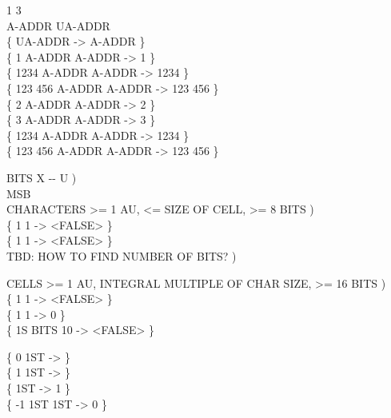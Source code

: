 \begin{tt}
  1      3   \\
 A-ADDR   UA-ADDR \\
\{ UA-ADDR  -> A-ADDR \} \\
\{       1 A-ADDR                 A-ADDR               ->       1 \} \\
\{    1234 A-ADDR \word{!}                 A-ADDR                ->    1234 \} \\
\{ 123 456 A-ADDR                 A-ADDR               -> 123 456 \} \\
\{       2 A-ADDR     A-ADDR   ->       2 \} \\
\{       3 A-ADDR     A-ADDR   ->       3 \} \\
\{    1234 A-ADDR  \word{!}    A-ADDR    ->    1234 \} \\
\{ 123 456 A-ADDR     A-ADDR   -> 123 456 \}

\word{:} BITS  X -{}- U ) \\
      MSB 
	       
\word{;} \\
 CHARACTERS >= 1 AU, <= SIZE OF CELL, >= 8 BITS ) \\
\{ 1  1  -> <FALSE> \} \\
\{ 1  1   -> <FALSE> \} \\
 TBD: HOW TO FIND NUMBER OF BITS? )

 CELLS >= 1 AU, INTEGRAL MULTIPLE OF CHAR SIZE, >= 16 BITS ) \\
\{ 1  1  -> <FALSE> \} \\
\{ 1  1   -> 0 \} \\
\{ 1S BITS 10  -> <FALSE> \}

\{  0 1ST \word{!}  -> \} \\
\{  1 1ST \word{+!} -> \} \\
\{    1ST   -> 1 \} \\
\{ -1 1ST \word{+!} 1ST  -> 0 \}
\end{tt}

